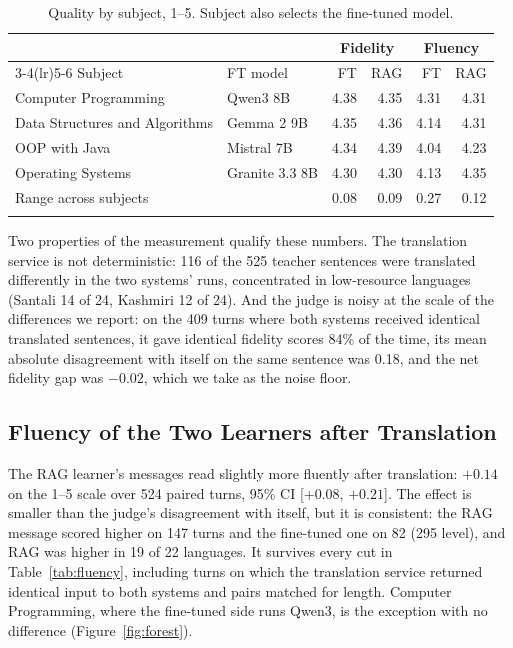 \documentclass[pdflatex,sn-mathphys-num]{sn-jnl}%
\theoremstyle{thmstyleone}%
\theoremstyle{thmstyletwo}%
\theoremstyle{thmstylethree}%
\begin{document}
\begin{table}[t]
\caption{Quality by subject, 1--5. Subject also selects the fine-tuned model.}\label{tab:subjects}
\footnotesize
\begin{tabular*}{\textwidth}{@{\extracolsep\fill}llrrrr}
\toprule
& & \multicolumn{2}{c}{Fidelity} & \multicolumn{2}{c}{Fluency} \\
\cmidrule(lr){3-4}\cmidrule(lr){5-6}
Subject & FT model & FT & RAG & FT & RAG \\
\midrule
Computer Programming & Qwen3 8B & 4.38 & 4.35 & 4.31 & 4.31 \\
Data Structures and Algorithms & Gemma 2 9B & 4.35 & 4.36 & 4.14 & 4.31 \\
OOP with Java & Mistral 7B & 4.34 & 4.39 & 4.04 & 4.23 \\
Operating Systems & Granite 3.3 8B & 4.30 & 4.30 & 4.13 & 4.35 \\
\midrule
Range across subjects & & 0.08 & 0.09 & 0.27 & 0.12 \\
\botrule
\end{tabular*}
\end{table}

Two properties of the measurement qualify these numbers. The translation service is not
deterministic: 116 of the 525 teacher sentences were translated differently in the two systems'
runs, concentrated in low-resource languages (Santali 14 of 24, Kashmiri 12 of 24). And the judge is
noisy at the scale of the differences we report: on the 409 turns where both systems received
identical translated sentences, it gave identical fidelity scores 84\% of the time, its mean absolute
disagreement with itself on the same sentence was 0.18, and the net fidelity gap was $-0.02$, which we
take as the noise floor.

\subsection{Fluency of the Two Learners after Translation}\label{sec:res-fluency}

The RAG learner's messages read slightly more fluently after translation: $+0.14$ on the 1--5 scale
over 524 paired turns, 95\% CI [$+0.08$, $+0.21$]. The effect is smaller than the judge's disagreement
with itself, but it is consistent: the RAG message scored higher on 147 turns and the fine-tuned one
on 82 (295 level), and RAG was higher in 19 of 22 languages. It survives every cut in
Table~\ref{tab:fluency}, including turns on which the translation service returned identical input to
both systems and pairs matched for length. Computer Programming, where the fine-tuned side runs
Qwen3, is the exception with no difference (Figure~\ref{fig:forest}).
\end{document}
